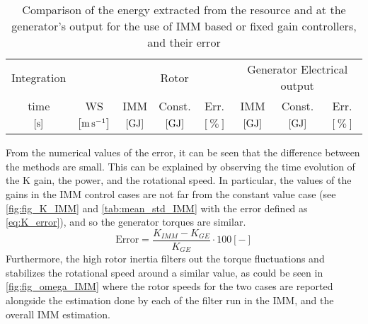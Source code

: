 \begin{table}[htb]
  \caption{Comparison of the energy extracted from the resource and at the generator's output for the use of IMM based or fixed gain controllers, and their error}
  \centering
  \begin{tabular}{cc|ccc|ccc}
    \toprule
    Integration & & \multicolumn{3}{c|}{Rotor} & \multicolumn{3}{c}{Generator Electrical output}\\
    time & WS & IMM & Const. & Err. & IMM & Const. & Err.\\
    $\left[\si{\second}\right]$ & $\left[\si{\meter\per\second}\right]$ & $\left[\si{\giga\joule}\right]$ &   $\left[\si{\giga\joule}\right]$ & $\left[\%\right]$& $\left[\si{\giga\joule}\right]$ &   $\left[\si{\giga\joule}\right]$ & $\left[\%\right]$ \\
    \midrule
    
  \end{tabular}
  \label{tab:comparison_IMM}
\end{table}

From the numerical values of the error, it can be seen that the difference between the methods are small. This can be explained by observing the time evolution of the K gain, the power, and the rotational speed. In particular, the values of the gains in the IMM control cases are not far from the constant value case (see \autoref{fig:fig_K_IMM} and \autoref{tab:mean_std_IMM} with the error defined as \autoref{eq:K_error}), and so the generator torques are similar.
\begin{equation}
  \text{Error} = \frac{K_{IMM}-K_{GE}}{K_{GE}}\cdot 100 \left[-\right]
  \label{eq:K_error}
\end{equation}
Furthermore, the high rotor inertia filters out the torque fluctuations and stabilizes the rotational speed around a similar value, as could be seen in \autoref{fig:fig_omega_IMM} where the rotor speeds for the two cases are reported alongside the estimation done by each of the filter run in the IMM, and the overall IMM estimation. 

